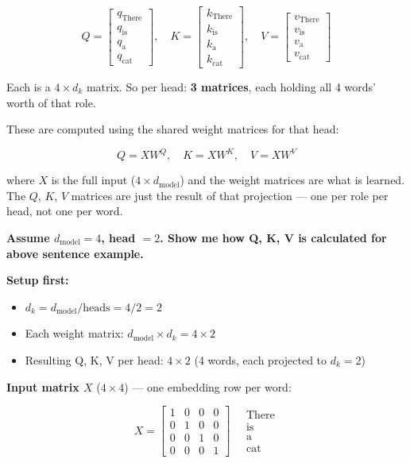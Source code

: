 \[
Q = \begin{bmatrix} q_{\text{There}} \\ q_{\text{is}} \\ q_{\text{a}} \\ q_{\text{cat}} \end{bmatrix}, \quad
K = \begin{bmatrix} k_{\text{There}} \\ k_{\text{is}} \\ k_{\text{a}} \\ k_{\text{cat}} \end{bmatrix}, \quad
V = \begin{bmatrix} v_{\text{There}} \\ v_{\text{is}} \\ v_{\text{a}} \\ v_{\text{cat}} \end{bmatrix}
\]

Each is a $4 \times d_k$ matrix. So per head: \textbf{3 matrices}, each holding all 4 words' worth of that role.

These are computed using the shared weight matrices for that head:

\[
Q = XW^Q, \quad K = XW^K, \quad V = XW^V
\]

where $X$ is the full input ($4 \times d_{\text{model}}$) and the weight matrices are what is learned. The $Q$, $K$, $V$ matrices are just the result of that projection --- one per role per head, not one per word.

\bigskip

\textbf{Assume $d_{\text{model}} = 4$, head $= 2$. Show me how Q, K, V is calculated for above sentence example.}

\textbf{Setup first:}
\begin{itemize}
    \item $d_k = d_{\text{model}} / \text{heads} = 4/2 = 2$
    \item Each weight matrix: $d_{\text{model}} \times d_k = 4 \times 2$
    \item Resulting Q, K, V per head: $4 \times 2$ (4 words, each projected to $d_k = 2$)
\end{itemize}

\textbf{Input matrix $X$} ($4 \times 4$) --- one embedding row per word:

\[
X = \begin{bmatrix} 1 & 0 & 0 & 0 \\ 0 & 1 & 0 & 0 \\ 0 & 0 & 1 & 0 \\ 0 & 0 & 0 & 1 \end{bmatrix}
\quad
\begin{array}{l} \text{There} \\ \text{is} \\ \text{a} \\ \text{cat} \end{array}
\]

